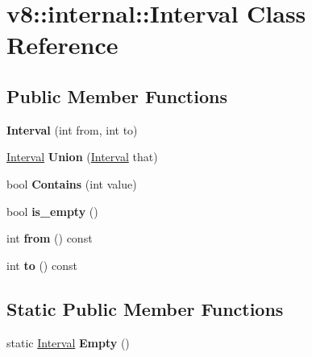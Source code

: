 \hypertarget{classv8_1_1internal_1_1_interval}{}\section{v8\+:\+:internal\+:\+:Interval Class Reference}
\label{classv8_1_1internal_1_1_interval}
\subsection*{Public Member Functions}
\begin{DoxyCompactItemize}
\item 
\hypertarget{classv8_1_1internal_1_1_interval_a1dd35e0358bb18930823d546ad01ac30}{}{\bfseries Interval} (int from, int to)\label{classv8_1_1internal_1_1_interval_a1dd35e0358bb18930823d546ad01ac30}

\item 
\hypertarget{classv8_1_1internal_1_1_interval_a8178f50f9964a63a34c2ac53c3732426}{}\hyperlink{classv8_1_1internal_1_1_interval}{Interval} {\bfseries Union} (\hyperlink{classv8_1_1internal_1_1_interval}{Interval} that)\label{classv8_1_1internal_1_1_interval_a8178f50f9964a63a34c2ac53c3732426}

\item 
\hypertarget{classv8_1_1internal_1_1_interval_ada3527bcada1af9754fbff580738ae20}{}bool {\bfseries Contains} (int value)\label{classv8_1_1internal_1_1_interval_ada3527bcada1af9754fbff580738ae20}

\item 
\hypertarget{classv8_1_1internal_1_1_interval_ad0a7a8fff4666d6de2e2989115752582}{}bool {\bfseries is\+\_\+empty} ()\label{classv8_1_1internal_1_1_interval_ad0a7a8fff4666d6de2e2989115752582}

\item 
\hypertarget{classv8_1_1internal_1_1_interval_a1a72362b822c8c8c185fc6d643166bfd}{}int {\bfseries from} () const \label{classv8_1_1internal_1_1_interval_a1a72362b822c8c8c185fc6d643166bfd}

\item 
\hypertarget{classv8_1_1internal_1_1_interval_a816dc198aca1bff99cf5703830a7abc3}{}int {\bfseries to} () const \label{classv8_1_1internal_1_1_interval_a816dc198aca1bff99cf5703830a7abc3}

\end{DoxyCompactItemize}
\subsection*{Static Public Member Functions}
\begin{DoxyCompactItemize}
\item 
\hypertarget{classv8_1_1internal_1_1_interval_a6131d294464930b38182ae30ac0e7bdf}{}static \hyperlink{classv8_1_1internal_1_1_interval}{Interval} {\bfseries Empty} ()\label{classv8_1_1internal_1_1_interval_a6131d294464930b38182ae30ac0e7bdf}

\end{DoxyCompactItemize}
